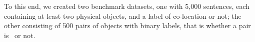 To this end, we created two 
benchmark datasets, one with 5,000 sentences, 
each containing at least two physical objects,
and a label of co-location or not; the other consisting of 500 pairs of
objects with binary labels, that is whether a pair is \lnear\ or not.  

%

%
%
%


